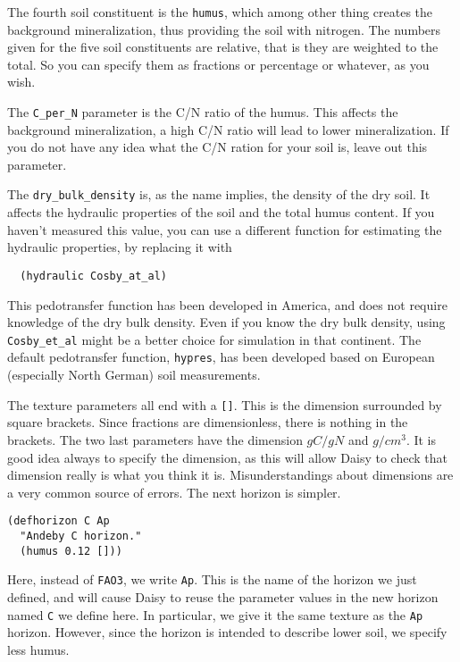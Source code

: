 \documentclass[a4paper]{article}
\begin{document}
The fourth soil constituent is the \texttt{humus}, which among other thing
creates the background mineralization, thus providing the soil with
nitrogen.  The numbers given for the five soil constituents are
relative, that is they are weighted to the total.  So you can specify
them as fractions or percentage or whatever, as you wish.

The \texttt{C\_per\_N} parameter is the C/N ratio of the humus.  This
affects the background mineralization, a high C/N ratio will lead to
lower mineralization.  If you do not have any idea what the C/N ration
for your soil is, leave out this parameter.

The \texttt{dry\_bulk\_density} is, as the name implies, the density
of the dry soil.  It affects the hydraulic properties of the soil and
the total humus content.  If you haven't measured this value, you can
use a different function for estimating the hydraulic properties, by
replacing it with
\begin{verbatim}
  (hydraulic Cosby_at_al)
\end{verbatim}
This pedotransfer function has been developed in America, and does not
require knowledge of the dry bulk density.  Even if you know the dry
bulk density, using \texttt{Cosby\_et\_al} might be a better choice
for simulation in that continent.  The default pedotransfer function,
\texttt{hypres}, has been developed based on European (especially
North German) soil measurements.

The texture parameters all end with a \verb|[]|.  This is the
dimension surrounded by square brackets.  Since fractions are
dimensionless, there is nothing in the brackets.  The two last
parameters have the dimension $g C/g N$ and $g/cm^3$.  It is good idea
always to specify the dimension, as this will allow Daisy to check
that dimension really is what you think it is.  Misunderstandings
about dimensions are a very common source of errors.  The next horizon
is simpler.

\begin{verbatim}
(defhorizon C Ap
  "Andeby C horizon."
  (humus 0.12 []))
\end{verbatim}

Here, instead of \texttt{FAO3}, we write \texttt{Ap}.  This is the
name of the horizon we just defined, and will cause Daisy to reuse
the parameter values in the new horizon named \texttt{C} we define
here.  In particular, we give it the same texture as the \texttt{Ap}
horizon.  However, since the horizon is intended to describe lower
soil, we specify less humus.
\end{document}
